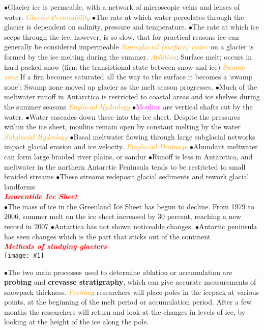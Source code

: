 \documentclass{article}
\newcommand{\ddd}{$\bullet$}
\newcommand{\red}[1]{\textcolor{red}{#1}}
\newcommand{\pink}[1]{\textcolor{magenta}{#1}}
\newcommand{\orange}[1]{\textcolor{orange}{#1}}
\newcommand{\mysection}[1]{\\ \textbf{\textit{\red{#1}}} \\}
\newcommand{\mysub}[1]{{\textit{\orange{#1}}}}
\newcommand{\vocab}[1]{{\pink{#1}}}
\newcommand{\fig}[1]{
	\texttt{[image: \#1]}
}
\begin{document}
\begin{multicols*}{4}
            \ddd Glacier ice is permeable, with a network of microscopic veins and lenses of water.
            \mysub{Glacier Permeability} 
                \ddd The rate at which water percolates through the glacier is dependent on salinity, pressure and temperature. 
                \ddd  The rate at which ice seeps through the ice, however, is so slow, that for practical reasons ice can generally be considered impermeable
            \mysub{Supraglacial (surface) water} on a glacier is formed by the ice melting during the summer.
            \mysub{Ablation}: Surface melt; occurs in hard packed snow (firn: the transistional state between snow and ice)
            \mysub{Swamp zone} If a firn becomes saturated all the way to the surface it becomes a ‘swamp zone’; Swamp zone moved up glacier as the melt season progresses.
            \ddd Much of the meltwater runoff in Antarctica is restricted to coastal areas and ice shelves during the summer seasons
            \mysub{Englacial Hydrology}
                \ddd \vocab{Moulins} are vertical shafts cut by the water.
                \ddd Water cascades down these into the ice sheet. Despite the pressures within the ice sheet, moulins remain open by constant melting by the water
            \mysub{Subglacial Hydrology}
                \ddd Basal meltwater flowing through large subglacial networks impact glacial erosion and ice velocity. 
            \mysub{Proglacial Drainage}
                \ddd Abundant meltwater can form large braided river plains, or sandur
                \ddd Runoff is less in Antarctica, and meltwater in the northern Antarctic Peninsula tends to be restricted to small braided streams
                \ddd These streams redeposit glacial sediments and rework glacial landforms
        \mysection{Laurentide Ice Sheet}
            \ddd The mass of ice in the Greenland Ice Sheet has begun to decline. From 1979 to 2006, summer melt on the ice sheet increased by 30 percent, reaching a new record in 2007
            \ddd Antartica has not shown noticeable changes. 
            \ddd Antartic peninsula has seen changes which is the part that sticks out of the continent
        \mysection{Methods of studying glaciers}
        \fig{mbMeas}
            \ddd The two main processes used to determine ablation or accumulation are \textbf{probing} and \textbf{crevasse stratigraphy}, which can give accurate measurements of snowpack thickness.
            \mysub{Probing}: researchers will place poles in the icepack at various points, at the beginning of the melt period or accumulation period. After a few months the researchers will return and look at the changes in levels of ice, by looking at the height of the ice along the pole.

\end{multicols*}
\end{document}
